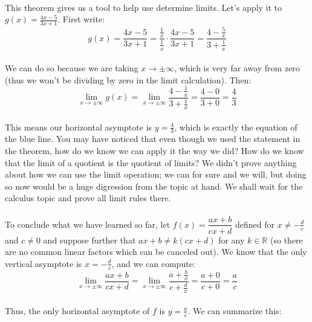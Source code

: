 \documentclass[12pt, a4paper, titlepage, twoside]{article}
\newcommand*{\R}{\mathbb{R}}
\begin{document}
	\paragraph{}
	This theorem gives us a tool to help use determine limits. Let's apply it to $g(x) = \frac{4x-5}{3x+1}$. First write:
	\[ g(x) = \dfrac{4x-5}{3x+1} = \dfrac{\tfrac{1}{x}}{\tfrac{1}{x}} \cdot \dfrac{4x-5}{3x+1} = \dfrac{4-\tfrac{5}{x}}{3+\tfrac{1}{x}} \]
	
	\paragraph{}
	We can do so because we are taking $x \to \pm \infty$, which is very far away from zero (thus we won't be dividing by zero in the limit
	calculation). Then:
	\[ \lim_{x \to \pm \infty} g(x) = \lim_{x \to \pm \infty} \dfrac{4-\tfrac{1}{x}}{3+\tfrac{1}{x}} = \dfrac{4-0}{3+0} = \dfrac{4}{3} \]
	
	\paragraph{}
	This means our horizontal asymptote is $y = \frac{4}{3}$, which is exactly the equation of the blue line. You may have noticed that
	even though we used the statement in the theorem, how do we know we can apply it the way we did? How do we know that the limit
	of a quotient is the quotient of limits? We didn't prove anything about how we can use the limit operation; we can for sure and we will,
	but doing so now would be a huge digression from the topic at hand. We shall wait for the calculus topic and prove all limit rules there.
	
	\paragraph{}
	To conclude what we have learned so far, let $f(x) = \dfrac{ax+b}{cx+d}$ defined for $x \neq -\frac{d}{c}$ and $c \neq 0$ and
	suppose further that $ax+b \neq k(cx+d)$ for any $k \in \R$ (so there are no common linear factors which can be canceled out). We know that 
	the only vertical asymptote is $x = -\frac{d}{c}$, and we can compute:
	\[ \lim_{x \to \pm \infty} \dfrac{ax+b}{cx+d} = \lim_{x \to \pm \infty} \dfrac{a+\tfrac{b}{x}}{c+\tfrac{d}{x}} = \dfrac{a+0}{c+0} = \dfrac{a}{c} \]
	
	\paragraph{}
	Thus, the only horizontal asymptote of $f$ is $y = \frac{a}{c}$. We can summarize this:\\
	
\end{document}
